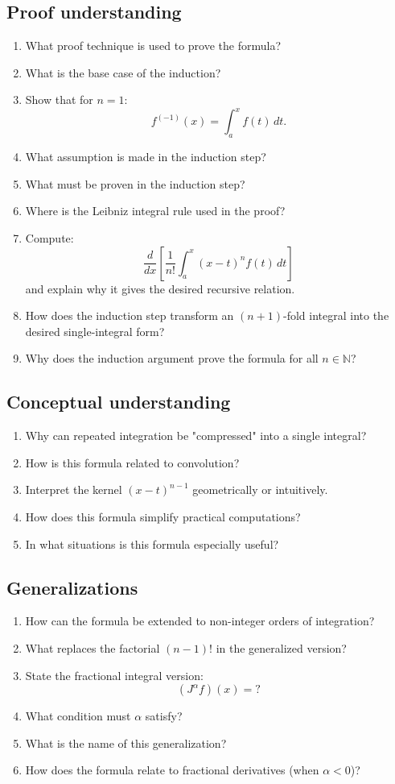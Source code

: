 \subsection{Proof understanding}
\begin{enumerate}[resume]
  \item What proof technique is used to prove the formula?
  \item What is the base case of the induction?
  \item Show that for $n=1$:
    \[
      f^{(-1)}(x) = \int_a^x f(t)\,dt.
    \]
  \item What assumption is made in the induction step?
  \item What must be proven in the induction step?
  \item Where is the Leibniz integral rule used in the proof?
  \item Compute:
    \[
      \frac{d}{dx} \left[ \frac{1}{n!} \int_a^x (x - t)^n f(t)\,dt \right]
    \]
    and explain why it gives the desired recursive relation.
  \item How does the induction step transform an $(n+1)$-fold integral into the desired single-integral form?
  \item Why does the induction argument prove the formula for all $n \in \mathbb{N}$?
\end{enumerate}

\subsection{Conceptual understanding}
\begin{enumerate}[resume]
  \item Why can repeated integration be "compressed" into a single integral?
  \item How is this formula related to convolution?
  \item Interpret the kernel $(x - t)^{n-1}$ geometrically or intuitively.
  \item How does this formula simplify practical computations?
  \item In what situations is this formula especially useful?
\end{enumerate}

\subsection{Generalizations}
\begin{enumerate}[resume]
  \item How can the formula be extended to non-integer orders of integration?
  \item What replaces the factorial $(n-1)!$ in the generalized version?
  \item State the fractional integral version:
    \[
      (J^\alpha f)(x) = ?
    \]
  \item What condition must $\alpha$ satisfy?
  \item What is the name of this generalization?
  \item How does the formula relate to fractional derivatives (when $\alpha < 0$)?
\end{enumerate}

